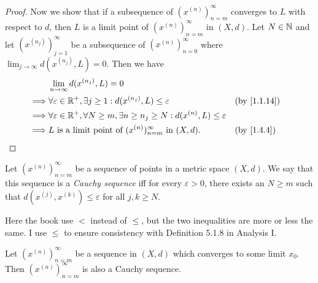 \begin{proof}
  Now we show that if a subsequence of \((x^{(n)})_{n = m}^\infty\) converges to \(L\) with respect to \(d\), then \(L\) is a limit point of \((x^{(n)})_{n = m}^\infty\) in \((X, d)\).
  Let \(N \in \mathbb{N}\) and let \((x^{(n_j)})_{j = 1}^\infty\) be a subsequence of \((x^{(n)})_{n = 0}^\infty\) where \(\lim_{j \to \infty} d(x^{(n_j)}, L) = 0\).
  Then we have
  \begin{align*}
             & \lim_{n \to \infty} d(x^{(n_j)}, L) = 0                                                                                      \\
    \implies & \forall \varepsilon \in \R^+, \exists j \geq 1 : d(x^{(n_j)}, L) \leq \varepsilon                           &  & \by{1.1.14} \\
    \implies & \forall \varepsilon \in \R^+,  \forall N \geq m, \exists n \geq n_j \geq N : d(x^{(n)}, L) \leq \varepsilon                  \\
    \implies & L \text{ is a limit point of } (x^{(n)})_{n = m}^\infty \text{ in } (X, d).                                 &  & \by{1.4.4}
  \end{align*}
\end{proof}

\begin{defn}\label{1.4.6}
  Let \((x^{(n)})_{n = m}^\infty\) be a sequence of points in a metric space \((X, d)\).
  We say that this sequence is a \emph{Cauchy sequence} iff for every \(\varepsilon > 0\), there exists an \(N \geq m\) such that \(d(x^{(j)}, x^{(k)}) \leq \varepsilon\) for all \(j, k \geq N\).
\end{defn}

\begin{note}
  Here the book use \(<\) instead of \(\leq\), but the two inequalities are more or less the same.
  I use \(\leq\) to ensure consistency with Definition 5.1.8 in Analysis I.
\end{note}

\begin{lem}\label{1.4.7}
  Let \((x^{(n)})_{n = m}^\infty\) be a sequence in \((X, d)\) which converges to some limit \(x_0\).
  Then \((x^{(n)})_{n = m}^\infty\) is also a Cauchy sequence.
\end{lem}

